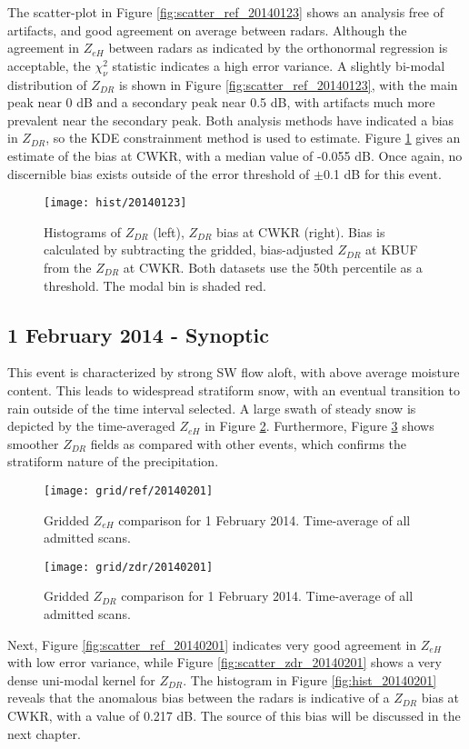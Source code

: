 The scatter-plot in Figure \ref{fig:scatter_ref_20140123} shows an analysis
free of artifacts, and good agreement on average between radars. Although the agreement in $Z_{eH}$ between
radars as indicated by the orthonormal regression is acceptable, the $\chi_\nu^{2}$
statistic indicates a high error variance. A slightly bi-modal distribution of $Z_{DR}$ is shown in 
Figure \ref{fig:scatter_ref_20140123}, with the main peak near 0 dB and a secondary peak near 0.5 dB, with
artifacts much more prevalent near the secondary
peak. Both analysis methods have indicated a bias in $Z_{DR}$, so the
KDE constrainment method is used to estimate. Figure \ref{fig:hist_20140123} gives an estimate of
the bias at CWKR, with a median value of -0.055 dB. Once again, no discernible bias exists outside of the error
threshold of $\pm$0.1 dB for this event.
\begin{figure}[H]
\texttt{[image: hist/20140123]}\centering
\caption{Histograms of $Z_{DR}$ (left), $Z_{DR}$ bias at CWKR (right). Bias is calculated by subtracting the gridded, bias-adjusted $Z_{DR}$ at KBUF from the
$Z_{DR}$ at CWKR. Both datasets use the 50th percentile as a threshold. The modal bin is shaded red. } 
\label{fig:hist_20140123}
\end{figure}

\subsection{1 February 2014 - Synoptic}
This event is characterized by strong SW flow aloft, with above average moisture content. This leads to
widespread stratiform snow, with an eventual transition to rain outside of the time interval selected.
A large swath of steady snow is depicted by the time-averaged $Z_{eH}$ in Figure \ref{fig:grid_ref_20140201}. 
Furthermore, Figure \ref{fig:grid_zdr_20140201} shows smoother $Z_{DR}$
fields as compared with other events, which confirms the stratiform nature of the precipitation. 
\begin{figure}[p]
\texttt{[image: grid/ref/20140201]}
\caption{Gridded $Z_{eH}$ comparison for 1 February 2014. Time-average of all admitted scans.} 
\label{fig:grid_ref_20140201}
\end{figure}
\begin{figure}[p]
\texttt{[image: grid/zdr/20140201]}
\caption{Gridded $Z_{DR}$ comparison for 1 February 2014. Time-average of all admitted scans.} 
\label{fig:grid_zdr_20140201}
\end{figure}
Next, Figure \ref{fig:scatter_ref_20140201} indicates very
good agreement in $Z_{eH}$ with low error variance, while Figure \ref{fig:scatter_zdr_20140201} shows a very dense uni-modal kernel for $Z_{DR}$. The
histogram in Figure \ref{fig:hist_20140201} reveals that the anomalous bias between the radars is indicative of a $Z_{DR}$ bias at CWKR, with a value of
0.217 dB. The source of this bias will be discussed in the next chapter.

